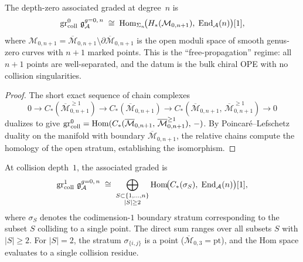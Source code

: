 \begin{proposition}
\label{prop:thqg-V-depth-zero}
The depth-zero associated graded at degree~$n$ is
\begin{equation}\label{eq:thqg-V-depth-zero}
\operatorname{gr}_{\mathrm{coll}}^0\,\mathfrak{g}^{g{=}0,\,n}_{\mathcal{A}}
\;\cong\;
\operatorname{Hom}_{\Sigma_n}\!\bigl(
 H_*(\mathcal{M}_{0,n+1}),\;
 \operatorname{End}_{\mathcal{A}}(n)
\bigr)[1],
\end{equation}
where $\mathcal{M}_{0,n+1} = \overline{\mathcal{M}}_{0,n+1}
\setminus \partial\overline{\mathcal{M}}_{0,n+1}$ is the open
moduli space of smooth genus-zero curves with $n+1$ marked points.
This is the ``free-propagation'' regime: all $n+1$ points are
well-separated, and the datum is the bulk chiral OPE with no
collision singularities.
\end{proposition}

\begin{proof}
The short exact sequence of chain complexes
\[
0 \to C_*(\overline{\mathcal{M}}_{0,n+1}^{\geq 1})
\to C_*(\overline{\mathcal{M}}_{0,n+1})
\to C_*(\overline{\mathcal{M}}_{0,n+1},\,
 \overline{\mathcal{M}}_{0,n+1}^{\geq 1})
\to 0
\]
dualizes to give
$\operatorname{gr}_{\mathrm{coll}}^0 = \operatorname{Hom}(C_*(\overline{\mathcal{M}}_{0,n+1},\,
\overline{\mathcal{M}}_{0,n+1}^{\geq 1}),\,-)$.
By Poincar\'e--Lefschetz duality on the manifold with boundary
$\overline{\mathcal{M}}_{0,n+1}$, the relative chains compute the
homology of the open stratum, establishing the isomorphism.
\end{proof}

\begin{proposition}
\label{prop:thqg-V-depth-one}
At collision depth~$1$, the associated graded is
\begin{equation}\label{eq:thqg-V-depth-one}
\operatorname{gr}_{\mathrm{coll}}^1\,\mathfrak{g}^{g{=}0,\,n}_{\mathcal{A}}
\;\cong\;
\bigoplus_{\substack{S \subset \{1,\dotsc,n\} \\
 |S| \geq 2}}
\operatorname{Hom}\!\bigl(
 C_*(\sigma_S),\;
 \operatorname{End}_{\mathcal{A}}(n)
\bigr)[1],
\end{equation}
where $\sigma_S$ denotes the codimension-$1$ boundary stratum
corresponding to the subset $S$ colliding to a single point.
The direct sum ranges over all subsets $S$ with $|S| \geq 2$.
For $|S| = 2$, the stratum $\sigma_{\{i,j\}}$ is a point
\textup{(}$\overline{\mathcal{M}}_{0,3} = \mathrm{pt}$\textup{)},
and the Hom space evaluates to a single collision residue.
\end{proposition}

